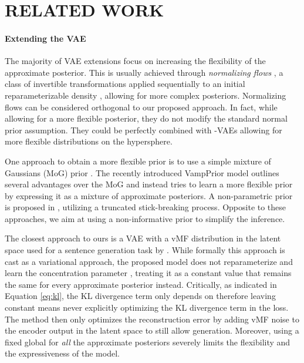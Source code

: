\documentclass[letterpaper]{article}
\newcommand{\Sv}{}
\begin{document}
\section{RELATED WORK} \label{sec:related-work}

\label{par:vae-ext}
\paragraph{Extending the VAE} The majority of VAE extensions focus on increasing the flexibility of the approximate posterior. This is usually achieved through \textit{normalizing flows} \citep{normalizing-flows}, a class of invertible transformations applied sequentially to an initial reparameterizable density , allowing for more complex posteriors. Normalizing flows can be considered orthogonal to our proposed approach. In fact, while allowing for a more flexible posterior, they do not modify the standard normal prior assumption. They could be perfectly combined with \Sv-VAEs allowing for more flexible distributions on the hypersphere.

One approach to obtain a more flexible prior is to use a simple mixture of Gaussians (MoG) prior \citep{gmm-prior-vae}. The recently introduced VampPrior model \citep{vamp-prior} outlines several advantages over the MoG and instead tries to learn a more flexible prior by expressing it as a mixture of approximate posteriors. A non-parametric prior is proposed in \citet{stick}, utilizing a truncated stick-breaking process. Opposite to these approaches, we aim at using a non-informative prior to simplify the inference.

The closest approach to ours is a VAE with a vMF distribution in the latent space used for a sentence generation task by \citep{guu2017generating}. While formally this approach is cast as a variational approach, the proposed model does not reparameterize and learn the concentration parameter , treating it as a constant value that remains the same for every approximate posterior instead. Critically, as indicated in Equation \ref{eq:kl}, the KL divergence term only depends on  therefore leaving  constant means never explicitly optimizing the KL divergence term in the loss. The method then only optimizes the reconstruction error by adding vMF noise to the encoder output in the latent space to still allow generation. Moreover, using a fixed global  for \textit{all} the approximate posteriors severely limits the flexibility and the expressiveness of the model.
 
\end{document}
